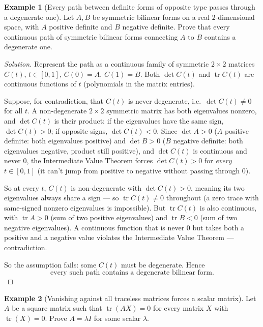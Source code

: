 \documentclass[11pt]{article}
\theoremstyle{definition}
\newtheorem{example}{Example}[section]
\newcommand{\trace}{\operatorname{tr}}
\begin{document}
\begin{example}[Every path between definite forms of opposite type passes through a degenerate one]
Let $A,B$ be symmetric bilinear forms on a real $2$-dimensional space, with $A$ positive definite and $B$ negative definite. Prove that every continuous path of symmetric bilinear forms connecting $A$ to $B$ contains a degenerate one.
\end{example}

\begin{proof}[Solution]
Represent the path as a continuous family of symmetric $2\times2$ matrices $C(t)$, $t\in[0,1]$, $C(0)=A$, $C(1)=B$. Both $\det C(t)$ and $\trace C(t)$ are continuous functions of $t$ (polynomials in the matrix entries).

Suppose, for contradiction, that $C(t)$ is never degenerate, i.e.\ $\det C(t)\neq0$ for all $t$. A non-degenerate $2\times2$ symmetric matrix has both eigenvalues nonzero, and $\det C(t)$ is their product: if the eigenvalues have the same sign, $\det C(t)>0$; if opposite signs, $\det C(t)<0$. Since $\det A>0$ ($A$ positive definite: both eigenvalues positive) and $\det B>0$ ($B$ negative definite: both eigenvalues negative, product still positive), and $\det C(t)$ is continuous and never $0$, the Intermediate Value Theorem forces $\det C(t)>0$ for \emph{every} $t\in[0,1]$ (it can't jump from positive to negative without passing through $0$).

So at every $t$, $C(t)$ is non-degenerate with $\det C(t)>0$, meaning its two eigenvalues always share a sign — so $\trace C(t)\neq0$ throughout (a zero trace with same-signed nonzero eigenvalues is impossible). But $\trace C(t)$ is also continuous, with $\trace A>0$ (sum of two positive eigenvalues) and $\trace B<0$ (sum of two negative eigenvalues). A continuous function that is never $0$ but takes both a positive and a negative value violates the Intermediate Value Theorem — contradiction.

So the assumption fails: some $C(t)$ must be degenerate. Hence
\[
\boxed{\text{every such path contains a degenerate bilinear form}}.
\]
\end{proof}

\begin{example}[Vanishing against all traceless matrices forces a scalar matrix]
Let $A$ be a square matrix such that $\trace(AX)=0$ for every matrix $X$ with $\trace(X)=0$. Prove $A=\lambda I$ for some scalar $\lambda$.
\end{example}
\end{document}
